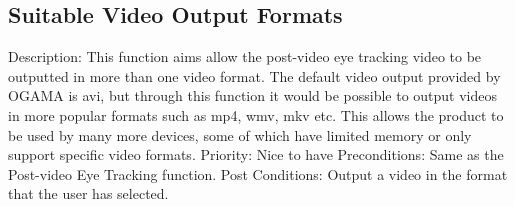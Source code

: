 \subsection{Suitable Video Output Formats} 
Description: This function aims allow the post-video eye tracking video to be outputted in more than one video format. The default video output provided by OGAMA is avi, but through this function it would be possible to output videos in more popular formats such as mp4, wmv, mkv etc. This allows the product to be used by many more devices, some of which have limited memory or only support specific video formats. 
Priority: Nice to have
Preconditions: Same as the Post-video Eye Tracking function. 
Post Conditions: Output a video in the format that the user has selected.

